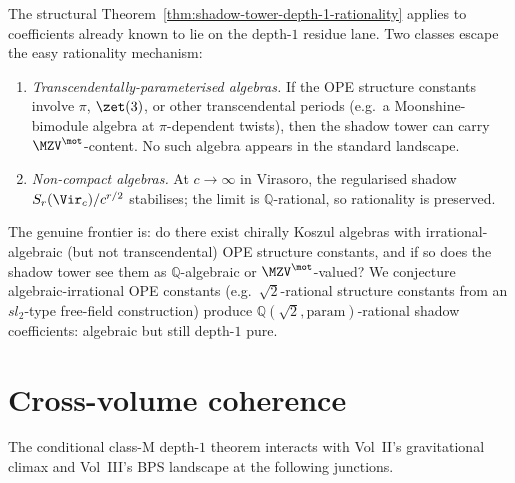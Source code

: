 \begin{remark}
The structural Theorem~\ref{thm:shadow-tower-depth-1-rationality}
applies to coefficients already known to lie on the depth-$1$ residue
lane. Two classes escape the easy rationality mechanism:
\begin{enumerate}
\item[(a)] \emph{Transcendentally-parameterised algebras.} If the
OPE structure constants involve $\pi$, $\zet(3)$, or other
transcendental periods (e.g.\ a Moonshine-bimodule algebra at
$\pi$-dependent twists), then the shadow tower can carry
$\MZV^{\mot}$-content. No such algebra appears in the standard
landscape.
\item[(b)] \emph{Non-compact algebras.} At $c \to \infty$ in
Virasoro, the regularised shadow $S_r(\Vir_c)/c^{r/2}$ stabilises;
the limit is
$\mathbb{Q}$-rational, so rationality is preserved.
\end{enumerate}
The genuine frontier is: do there exist chirally Koszul algebras
with irrational-algebraic (but not transcendental) OPE structure
constants, and if so does the shadow tower see them as
$\mathbb{Q}$-algebraic or $\MZV^{\mot}$-valued? We conjecture
algebraic-irrational OPE constants (e.g.\ $\sqrt{2}$-rational
structure constants from an $sl_2$-type free-field construction)
produce $\mathbb{Q}(\sqrt{2}, \mathrm{param})$-rational shadow
coefficients: algebraic but still depth-$1$ pure.
\end{remark}

\section{Cross-volume coherence}
\label{sec:cross-volume-coherence}

The conditional class-M depth-$1$ theorem interacts with Vol~II's
gravitational climax and Vol~III's BPS landscape at the following
junctions.


